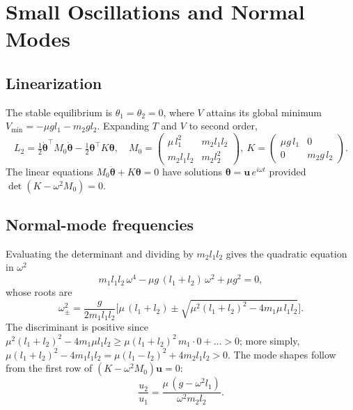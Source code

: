 \documentclass[11pt,a4paper]{book}
\theoremstyle{definition}
\theoremstyle{remark}
\begin{document}
\section{Small Oscillations and Normal Modes}
\label{sec:small}

\subsection{Linearization}

The stable equilibrium is $\theta_1=\theta_2=0$, where $V$ attains its global minimum $V_{\min}=-\mu g l_1-m_2g l_2$.
Expanding $T$ and $V$ to second order,
\begin{equation}
  L_2=\tfrac12\dot{\bm\theta}^\top M_0\dot{\bm\theta}-\tfrac12\bm\theta^\top K\bm\theta,
  \quad
  M_0=\begin{pmatrix}\mu\,l_1^2&m_2l_1l_2\\ m_2l_1l_2&m_2l_2^2\end{pmatrix},\
  K=\begin{pmatrix}\mu g\,l_1&0\\0&m_2g\,l_2\end{pmatrix}.
\end{equation}
The linear equations $M_0\ddot{\bm\theta}+K\bm\theta=0$ have solutions $\bm\theta=\bm u\,e^{i\omega t}$ provided
$\det(K-\omega^2M_0)=0$.

\subsection{Normal-mode frequencies}

Evaluating the determinant and dividing by $m_2l_1l_2$ gives the quadratic equation in $\omega^2$
\begin{equation}
  m_1l_1l_2\,\omega^4-\mu g\,(l_1+l_2)\,\omega^2+\mu g^2=0,
\end{equation}
whose roots are
\begin{equation}
  \omega_\pm^2=\frac{g}{2m_1l_1l_2}\Big[\mu\,(l_1+l_2)\pm\sqrt{\mu^2(l_1+l_2)^2-4m_1\mu\,l_1l_2}\Big].
  \label{eq:omega}
\end{equation}
The discriminant is positive since $\mu^2(l_1+l_2)^2-4m_1\mu l_1l_2\ge\mu(l_1+l_2)^2\,m_1\!\cdot\!0+\ldots>0$; more simply,
$\mu(l_1+l_2)^2-4m_1l_1l_2=\mu(l_1-l_2)^2+4m_2l_1l_2>0$.
The mode shapes follow from the first row of $(K-\omega^2M_0)\bm u=0$:
\begin{equation}
  \frac{u_2}{u_1}=\frac{\mu\,(g-\omega^2l_1)}{\omega^2m_2l_2}.
\end{equation}
\end{document}

